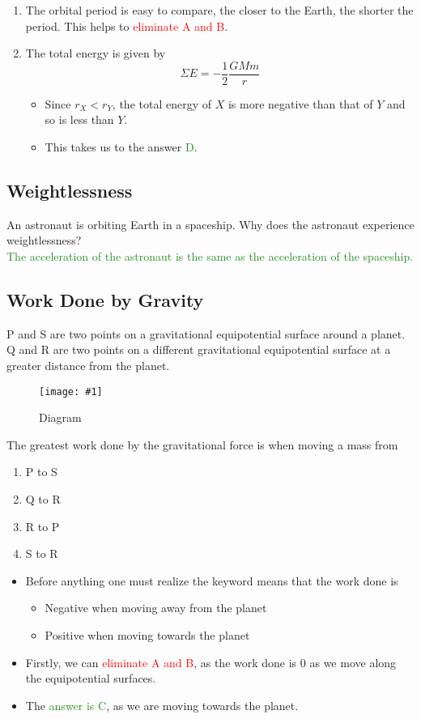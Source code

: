 \documentclass[a4paper,12pt]{article}
\newcommand{\lb}{\\[8pt]}
\newcommand{\img}[4]{\begin{center}
  \begin{figure}[H]
    \centering
    \texttt{[image: \#1]}
    \caption{#3}
    \label{fig:#4}
  \end{figure}
\end{center}}
\begin{document}
\begin{enumerate}
  \item The orbital period is easy to compare, the closer to the Earth, the shorter the period. This helps to \textcolor{red}{eliminate A and B}.
  \item The total energy is given by $$\Sigma E = -\frac{1}{2} \frac{GMm}{r}$$
        \begin{itemize}
          \item Since $r_X < r_Y$, the total energy of $X$ is more negative than that of $Y$ and so is less than $Y$.
          \item This takes us to the answer \textcolor{ForestGreen}{D}.
        \end{itemize}
\end{enumerate}

\pagebreak

\subsection{Weightlessness}

An astronaut is orbiting Earth in a spaceship. Why does the astronaut experience weightlessness?\lb
\textcolor{ForestGreen}{The acceleration of the astronaut is the same as the acceleration of the spaceship.}

\pagebreak

\subsection{Work Done by Gravity}

P and S are two points on a gravitational equipotential surface around a planet. Q and R are two points on a different gravitational equipotential surface at a greater distance from the planet.

\img{ex/8.png}{0.3}{Diagram}{ex8}

The greatest work done by the gravitational force is when moving a mass from
\begin{enumerate}[label=\Alph*.]
  \item P to S
  \item Q to R
  \item R to P
  \item S to R
\end{enumerate}

\begin{itemize}
  \item Before anything one must realize the keyword  means that the work done is
        \begin{itemize}
          \item Negative when moving away from the planet
          \item Positive when moving towards the planet
        \end{itemize}
  \item Firstly, we can \textcolor{red}{eliminate A and B}, as the work done is 0 as we move along the equipotential surfaces.
  \item The \textcolor{ForestGreen}{answer is C}, as we are moving towards the planet.
\end{itemize}
\end{document}
